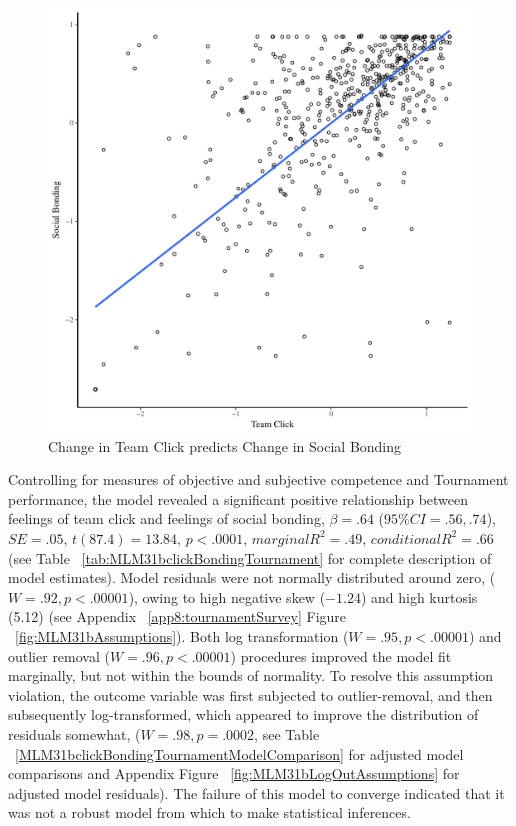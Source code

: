 \begin{CJK}{UTF8}{gbsn}
        \begin{figure}[htbp]
          \centering
        \includegraphics[scale=.5]{images/clickBondOverallBasicXY.pdf}
          \caption{Change in Team Click predicts Change in Social Bonding}
          \label{fig:clickBondOverallBasicXY}
        \end{figure}

   Controlling for measures of objective and subjective competence and Tournament performance, the model revealed a significant positive relationship between feelings of team click and feelings of social bonding, $\beta = .64$ ($95\% CI = .56, .74$), $SE = .05$, $t(87.4) = 13.84$, $p < .0001$, $marginal R^2 = .49$, $conditional R^2 = .66$ (see Table ~\ref{tab:MLM31bclickBondingTournament} for complete description of model estimates). Model residuals were not normally distributed around zero, ($W = .92, p < .00001$), owing to high negative skew ($-1.24$) and high kurtosis (5.12) (see Appendix ~\ref{app8:tournamentSurvey} Figure ~\ref{fig:MLM31bAssumptions}).
   Both log transformation ($W = .95, p < .00001$) and outlier removal ($W = .96, p < .00001$) procedures improved the model fit marginally, but not within the bounds of normality.  To resolve this assumption violation, the outcome variable was first subjected to outlier-removal, and then subsequently log-transformed, which appeared to improve the distribution of residuals somewhat, ($W = .98, p = .0002$, see Table ~\ref{MLM31bclickBondingTournamentModelComparison} for adjusted model comparisons and Appendix Figure ~\ref{fig:MLM31bLogOutAssumptions} for adjusted model residuals).  The failure of this model to converge indicated that it was not a robust model from which to make statistical inferences.


\end{CJK}
